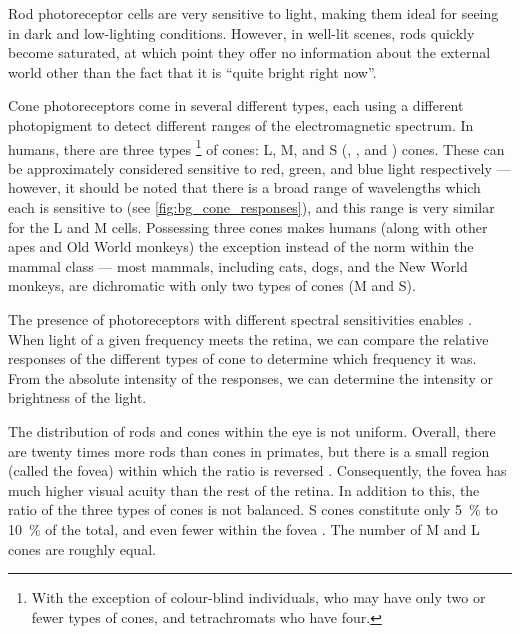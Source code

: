 Rod photoreceptor cells are very sensitive to light, making them ideal for seeing in dark and low-lighting conditions.
However, in well-lit scenes, rods quickly become saturated, at which point they offer no information about the external world other than the fact that it is ``quite bright right now''.

Cone photoreceptors come in several different types, each using a different photopigment to detect different ranges of the electromagnetic spectrum.
In humans, there are three types%
\footnote{With the exception of colour-blind individuals, who may have only two or fewer types of cones, and tetrachromats \citep{Nagy1981,Jordan1993,Jameson2001} who have four.}
of cones:
\acl{L}, \acl{M}, and \acl{S} (, , and ) cones.
These can be approximately considered sensitive to red, green, and blue light respectively --- however, it should be noted that there is a broad range of wavelengths which each is sensitive to (see \autoref{fig:bg_cone_responses}), and this range is very similar for the \ac{L} and \ac{M} cells.
Possessing three cones makes humans (along with other apes and Old World monkeys) the exception instead of the norm within the mammal class --- most mammals, including cats, dogs, and the New World monkeys, are dichromatic with only two types of cones (\ac{M} and \ac{S}).

The presence of photoreceptors with different spectral sensitivities enables .
When light of a given frequency meets the retina, we can compare the relative responses of the different types of cone to determine which frequency it was.
From the absolute intensity of the responses, we can determine the intensity or brightness of the light.

The distribution of rods and cones within the eye is not uniform.
Overall, there are twenty times more rods than cones in primates, but there is a small region (called the fovea) within which the ratio is reversed \citep[Chapter~11]{nsbook}.
Consequently, the fovea has much higher visual acuity than the rest of the retina.
In addition to this, the ratio of the three types of cones is not balanced.
\ac{S} cones constitute only \SI{5}{\percent} to \SI{10}{\percent} of the total, and even fewer within the fovea \citep[Chapter~11]{nsbook}.
The number of \ac{M} and \ac{L} cones are roughly equal.



